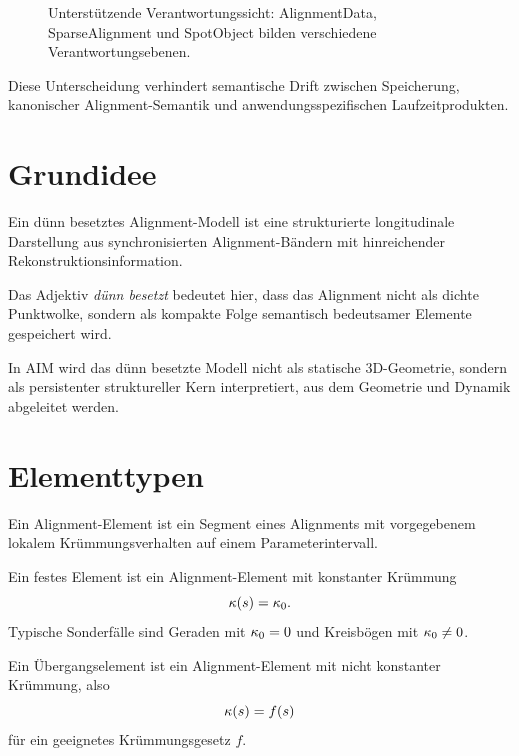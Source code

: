 \begin{figure}[htbp]
\centering

\caption{Unterstützende Verantwortungssicht: AlignmentData, SparseAlignment und SpotObject bilden verschiedene Verantwortungsebenen.}
\label{fig:support-alignmentdata-sparse-spotobject}
\end{figure}

Diese Unterscheidung verhindert semantische Drift zwischen Speicherung,
kanonischer Alignment-Semantik und anwendungsspezifischen Laufzeitprodukten.

\section{Grundidee}

\begin{definition}
Ein dünn besetztes Alignment-Modell ist eine strukturierte longitudinale
Darstellung aus synchronisierten Alignment-Bändern mit hinreichender
Rekonstruktionsinformation.
\end{definition}

Das Adjektiv \emph{dünn besetzt} bedeutet hier, dass das Alignment nicht als
dichte Punktwolke, sondern als kompakte Folge semantisch bedeutsamer Elemente
gespeichert wird.

In AIM wird das dünn besetzte Modell nicht als statische 3D-Geometrie, sondern
als persistenter struktureller Kern interpretiert, aus dem Geometrie und
Dynamik abgeleitet werden.

\section{Elementtypen}

\begin{definition}
Ein Alignment-Element ist ein Segment eines Alignments mit vorgegebenem
lokalem Krümmungsverhalten auf einem Parameterintervall.
\end{definition}

\begin{definition}
Ein festes Element ist ein Alignment-Element mit konstanter Krümmung
\[
\kappa(s)=\kappa_0.
\]
Typische Sonderfälle sind Geraden mit \(\kappa_0=0\) und Kreisbögen mit
\(\kappa_0\neq 0\).
\end{definition}

\begin{definition}[Übergangselement]
Ein Übergangselement ist ein Alignment-Element mit nicht konstanter Krümmung,
also
\[
\kappa(s)=f(s)
\]
für ein geeignetes Krümmungsgesetz \(f\).
\end{definition}

